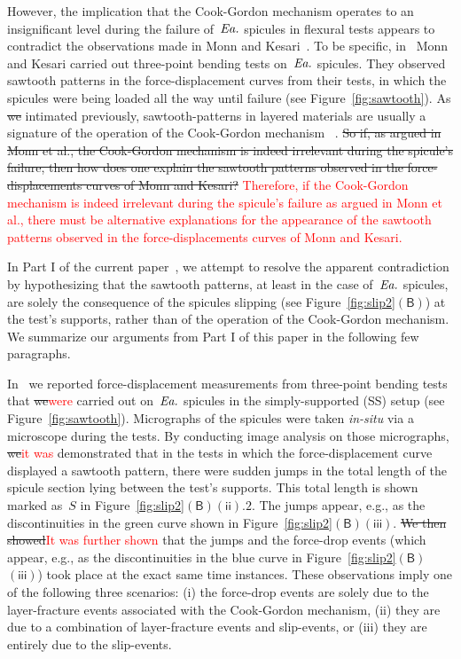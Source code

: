 \documentclass[preprint,10pt,times]{elsarticle}
\makeatletter
\numberwithin{equation}{section}
\newcommand{\pr}[1]{\left( #1 \right)}
\newcommand{\EA}{\textit{Ea.\@}\xspace}
\newcommand{\subf}[1]{\pr{\textsf{#1}}}
\makeatother
\begin{document}
\medskip{}

However, the implication that the Cook-Gordon mechanism operates to
an insignificant level during the failure of~$\EA$ spicules in flexural
tests appears to contradict the observations made in Monn and Kesari~\cite{sarikaya2001biomimetic,levi1989remarkably,monn2017enhanced}.
To be specific, in~\cite{monn2017enhanced} Monn and Kesari carried
out three-point bending tests on~$\EA$ spicules. They observed sawtooth
patterns in the force-displacement curves from their tests, in which
the spicules were being loaded all the way until failure (see Figure~\ref{fig:sawtooth}).
As \sout{we }intimated previously, sawtooth-patterns in layered materials
are usually a signature of the operation of the Cook-Gordon mechanism~\cite{clegg1990simple}
. \sout{So if, as argued in Monn et al., the Cook-Gordon mechanism is indeed
irrelevant during the spicule's failure, then how does one explain
the sawtooth patterns observed in the force-displacements curves of
Monn and Kesari?}
\textcolor{red}{Therefore, if the Cook-Gordon mechanism is indeed
irrelevant during the spicule's failure as argued in Monn et al., there must be alternative explanations for the appearance of the sawtooth patterns observed in the force-displacements curves of Monn and Kesari.}

In Part I of the current paper~\cite{Sayaka2021Sawtooth}, we attempt
to resolve the apparent contradiction by hypothesizing that the sawtooth
patterns, at least in the case of~$\EA$ spicules, are solely the
consequence of the spicules slipping (see Figure~\ref{fig:slip2}$\subf{B}$)
at the test's supports, rather than of the operation of the Cook-Gordon
mechanism. We summarize our arguments from Part I of this paper in
the following few paragraphs.

\medskip{}

In~\cite{Sayaka2021Sawtooth} we reported force-displacement measurements
from three-point bending tests that \sout{we}\textcolor{red}{were} carried out on~$\EA$ spicules
in the simply-supported (SS) setup (see Figure~\ref{fig:sawtooth}).
Micrographs of the spicules were taken\textit{ in-situ} via a microscope
during the tests. By conducting image analysis on those micrographs,
\sout{we}\textcolor{red}{it was} demonstrated that in the tests in which the force-displacement
curve displayed a sawtooth pattern, there were sudden jumps in the
total length of the spicule section lying between the test's supports.
This total length is shown marked as~$S$ in Figure~\ref{fig:slip2}$\subf{B}$$\subf{ii}.2$.
The jumps appear, e.g., as the discontinuities in the green curve
shown in Figure~\ref{fig:slip2}$\subf{B}$$\subf{iii}$. \sout{We then
showed}\textcolor{red}{It was further shown} that the jumps and the force-drop events (which appear, e.g.,
as the discontinuities in the blue curve in Figure~\ref{fig:slip2}$\subf{B}$$\subf{iii}$)
took place at the exact same time instances. These observations imply
one of the following three scenarios: (i) the force-drop events are
solely due to the layer-fracture events associated with the Cook-Gordon
mechanism, (ii) they are due to a combination of layer-fracture events
and slip-events, or (iii) they are entirely due to the slip-events.
\end{document}
